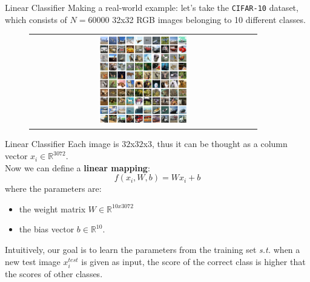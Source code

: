 \documentclass[aspectratio=169]{beamer}
\newcommand{\R}{\mathbb{R}}
\begin{document}
\begin{frame}{Linear Classifier}
Making a real-world example: let's take the \texttt{CIFAR-10} dataset, which consists of $N=60000$ 32x32 RGB images belonging to 10 different classes.\\
\begin{figure}
\begin{tabular}{c}
\includegraphics[width=0.4\textwidth]{img/dnn/cifar10.png}
\end{tabular}
\end{figure}
\end{frame}


\begin{frame}{Linear Classifier}
Each image is $32$x$32$x$3$, thus it can be thought as a column vector $x_i \in \R^{3072}$.\\
Now we can define a \textbf{linear mapping}:
\begin{equation*}
f(x_i,W,b) = Wx_i + b
\end{equation*}
where the parameters are:
\begin{itemize}
\item the weight matrix $W \in \R^{10 x 3072}$ 
\item the bias vector $b \in \R^{10}$.
\end{itemize}
\small{Intuitively, our goal is to learn the parameters from the training set \emph{s.t.} when a new test image $x^{test}_i$ is given as input, the score of the correct class is higher that the scores of other classes.}
\end{frame}

\end{document}
